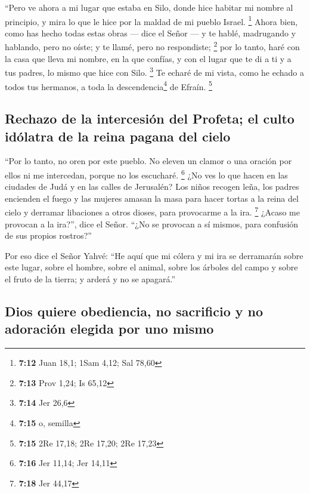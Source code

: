  ``Pero ve ahora a mi lugar que estaba en Silo, donde
hice habitar mi nombre al principio, y mira lo que le hice por la maldad
de mi pueblo Israel. \footnote{\textbf{7:12} Juan 18,1; 1Sam 4,12; Sal
  78,60}  Ahora bien, como has hecho todas estas obras
--- dice el Señor --- y te hablé, madrugando y hablando, pero no oíste;
y te llamé, pero no respondiste; \footnote{\textbf{7:13} Prov 1,24; Is
  65,12}  por lo tanto, haré con la casa que lleva mi
nombre, en la que confías, y con el lugar que te di a ti y a tus padres,
lo mismo que hice con Silo. \footnote{\textbf{7:14} Jer 26,6}
 Te echaré de mi vista, como he echado a todos tus
hermanos, a toda la descendencia\footnote{\textbf{7:15} o, semilla} de
Efraín. \footnote{\textbf{7:15} 2Re 17,18; 2Re 17,20; 2Re 17,23}

\hypertarget{rechazo-de-la-intercesiuxf3n-del-profeta-el-culto-iduxf3latra-de-la-reina-pagana-del-cielo}{%
\subsection{Rechazo de la intercesión del Profeta; el culto idólatra de
la reina pagana del
cielo}\label{rechazo-de-la-intercesiuxf3n-del-profeta-el-culto-iduxf3latra-de-la-reina-pagana-del-cielo}}

 ``Por lo tanto, no oren por este pueblo. No eleven un
clamor o una oración por ellos ni me intercedan, porque no los
escucharé. \footnote{\textbf{7:16} Jer 11,14; Jer 14,11} 
¿No ves lo que hacen en las ciudades de Judá y en las calles de
Jerusalén?  Los niños recogen leña, los padres encienden
el fuego y las mujeres amasan la masa para hacer tortas a la reina del
cielo y derramar libaciones a otros dioses, para provocarme a la ira.
\footnote{\textbf{7:18} Jer 44,17}  ¿Acaso me provocan a
la ira?'', dice el Señor. ``¿No se provocan a sí mismos, para confusión
de sus propios rostros?''

 Por eso dice el Señor Yahvé: ``He aquí que mi cólera y
mi ira se derramarán sobre este lugar, sobre el hombre, sobre el animal,
sobre los árboles del campo y sobre el fruto de la tierra; y arderá y no
se apagará.''

\hypertarget{dios-quiere-obediencia-no-sacrificio-y-no-adoraciuxf3n-elegida-por-uno-mismo}{%
\subsection{Dios quiere obediencia, no sacrificio y no adoración elegida
por uno
mismo}\label{dios-quiere-obediencia-no-sacrificio-y-no-adoraciuxf3n-elegida-por-uno-mismo}}

